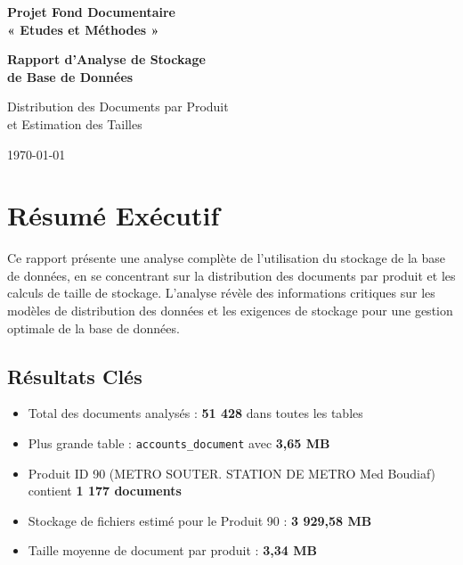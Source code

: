 \documentclass[12pt,a4paper]{article}
\begin{document}
\thispagestyle{empty}
\begin{center}
\vspace*{2cm}

{\Huge \textbf{Projet Fond Documentaire}}\\
\vspace{0.5cm}
{\Large \textbf{« Etudes et Méthodes »}}\\

\vspace{3cm}

{\LARGE \textbf{Rapport d'Analyse de Stockage}}\\
\vspace{0.5cm}
{\LARGE \textbf{de Base de Données}}\\

\vspace{2cm}

{\large Distribution des Documents par Produit}\\
{\large et Estimation des Tailles}

\vfill


{\large \today}

\end{center}
\newpage

\setcounter{page}{1}

\tableofcontents
\newpage

\section{Résumé Exécutif}

Ce rapport présente une analyse complète de l'utilisation du stockage de la base de données, en se concentrant sur la distribution des documents par produit et les calculs de taille de stockage. L'analyse révèle des informations critiques sur les modèles de distribution des données et les exigences de stockage pour une gestion optimale de la base de données.

\subsection{Résultats Clés}
\begin{itemize}
    \item Total des documents analysés : \textbf{51 428} dans toutes les tables
    \item Plus grande table : \texttt{accounts\_document} avec \textbf{3,65 MB}
    \item Produit ID 90 (METRO SOUTER. STATION DE METRO Med Boudiaf) contient \textbf{1 177 documents}
    \item Stockage de fichiers estimé pour le Produit 90 : \textbf{3 929,58 MB}
    \item Taille moyenne de document par produit : \textbf{3,34 MB}
\end{itemize}
\end{document}
